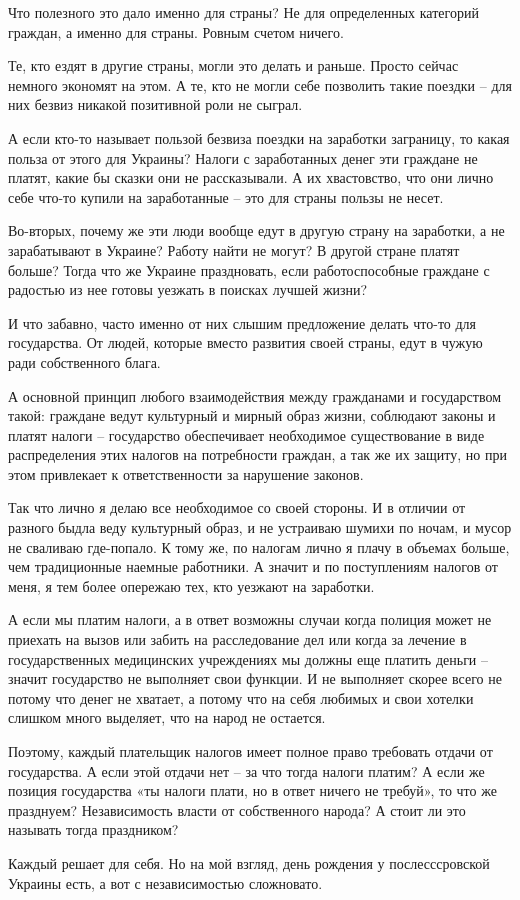 Что полезного это дало именно для страны? Не для определенных категорий граждан, а именно для страны. Ровным счетом ничего.

Те, кто ездят в другие страны, могли это делать и раньше. Просто сейчас немного
экономят на этом. А те, кто не могли себе позволить такие поездки – для них
безвиз никакой позитивной роли не сыграл.

А если кто-то называет пользой безвиза поездки на заработки заграницу, то какая
польза от этого для Украины? Налоги с заработанных денег эти граждане не
платят, какие бы сказки они не рассказывали. А их хвастовство, что они лично
себе что-то купили на заработанные – это для страны пользы не несет.

Во-вторых, почему же эти люди вообще едут в другую страну на заработки, а не
зарабатывают в Украине? Работу найти не могут? В другой стране платят больше?
Тогда что же Украине праздновать, если работоспособные граждане с радостью из
нее готовы уезжать в поисках лучшей жизни?

И что забавно, часто именно от них слышим предложение делать что-то для
государства. От людей, которые вместо развития своей страны, едут в чужую ради
собственного блага.

А основной принцип любого взаимодействия между гражданами и государством такой:
граждане ведут культурный и мирный образ жизни, соблюдают законы и платят
налоги – государство обеспечивает необходимое существование в виде
распределения этих налогов на потребности граждан, а так же их защиту, но при
этом привлекает к ответственности за нарушение законов.

Так что лично я делаю все необходимое со своей стороны. И в отличии от разного
быдла веду культурный образ, и не устраиваю шумихи по ночам, и мусор не
сваливаю где-попало. К тому же, по налогам лично я плачу в объемах больше, чем
традиционные наемные работники. А значит и по поступлениям налогов от меня, я
тем более опережаю тех, кто уезжают на заработки. 

А если мы платим налоги, а в ответ возможны случаи когда полиция может не
приехать на вызов или забить на расследование дел или когда за лечение в
государственных медицинских учреждениях мы должны еще платить деньги – значит
государство не выполняет свои функции. И не выполняет скорее всего не потому
что денег не хватает, а потому что на себя любимых и свои хотелки слишком много
выделяет, что на народ не остается.

Поэтому, каждый плательщик налогов имеет полное право требовать отдачи от
государства. А если этой отдачи нет – за что тогда налоги платим? А если же
позиция государства «ты налоги плати, но в ответ ничего не требуй», то что же
празднуем? Независимость власти от собственного народа? А стоит ли это называть
тогда праздником?

Каждый решает для себя. Но на мой взгляд, день рождения у послесссровской
Украины есть, а вот с независимостью сложновато.
